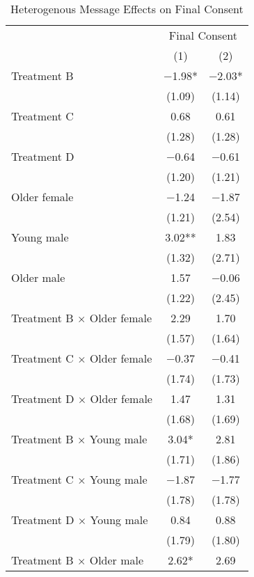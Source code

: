 \documentclass[12pt, a4paper]{article}
\begin{document}
\begin{table}[H]

\caption{\label{tab:consent-lm-interaction-reg}Heterogenous Message Effects on Final Consent}
\centering
\fontsize{8}{10}\selectfont
\begin{threeparttable}
\begin{tabular}[t]{lcc}
\toprule
\multicolumn{1}{c}{ } & \multicolumn{2}{c}{Final Consent} \\
\cmidrule(l{3pt}r{3pt}){2-3}
  & (1) & (2)\\
\midrule
Treatment B & \num{-1.98}* & \num{-2.03}*\\
 & (\num{1.09}) & (\num{1.14})\\
Treatment C & \num{0.68} & \num{0.61}\\
 & (\num{1.28}) & (\num{1.28})\\
Treatment D & \num{-0.64} & \num{-0.61}\\
 & (\num{1.20}) & (\num{1.21})\\
Older female & \num{-1.24} & \num{-1.87}\\
 & (\num{1.21}) & (\num{2.54})\\
Young male & \num{3.02}** & \num{1.83}\\
 & (\num{1.32}) & (\num{2.71})\\
Older male & \num{1.57} & \num{-0.06}\\
 & (\num{1.22}) & (\num{2.45})\\
Treatment B $\times$ Older female & \num{2.29} & \num{1.70}\\
 & (\num{1.57}) & (\num{1.64})\\
Treatment C $\times$ Older female & \num{-0.37} & \num{-0.41}\\
 & (\num{1.74}) & (\num{1.73})\\
Treatment D $\times$ Older female & \num{1.47} & \num{1.31}\\
 & (\num{1.68}) & (\num{1.69})\\
Treatment B $\times$ Young male & \num{3.04}* & \num{2.81}\\
 & (\num{1.71}) & (\num{1.86})\\
Treatment C $\times$ Young male & \num{-1.87} & \num{-1.77}\\
 & (\num{1.78}) & (\num{1.78})\\
Treatment D $\times$ Young male & \num{0.84} & \num{0.88}\\
 & (\num{1.79}) & (\num{1.80})\\
Treatment B $\times$ Older male & \num{2.62}* & \num{2.69}\\

\end{tabular}
\end{threeparttable}
\end{table}
\end{document}
